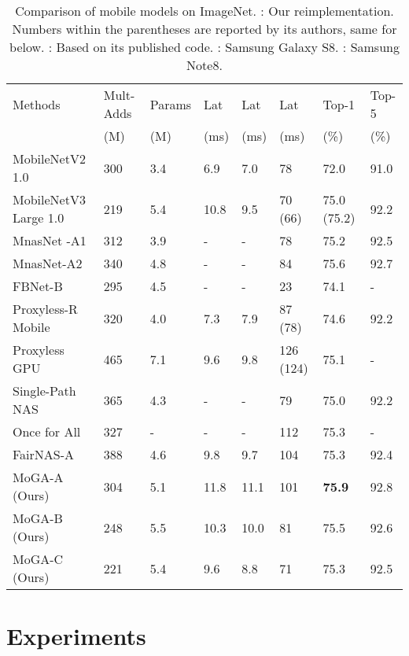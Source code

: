 \documentclass[letterpaper]{article} \usepackage{aaai20}  \usepackage{times}  \usepackage{helvet} \usepackage{courier}  \usepackage[hyphens]{url}  \usepackage{graphicx} \urlstyle{rm} \def\UrlFont{\rm}  \usepackage{graphicx}  \usepackage{amsmath}
\begin{document}
\begin{table*}
	\begin{center}
	  \begin{small}
		\begin{tabular}{*{8}{l}} 			
		\toprule
			Methods & Mult-Adds  & Params & Lat&  Lat& Lat & Top-1  & Top-5  \\
			& (M) & (M) & (ms) & (ms) & (ms) & (\%) & (\%) \\
			\midrule
			MobileNetV2 1.0 \cite{sandler2018mobilenetv2}& 300 & 3.4 & 6.9 & 7.0 & 78 & 72.0 & 91.0\\ MobileNetV3 Large 1.0  \cite{howard2019searching} & 219 & 5.4 & 10.8 & 9.5 &70 (66) &75.0 (75.2) & 92.2 \\ \midrule
			MnasNet -A1 \cite{tan2018mnasnet} & 312 & 3.9 &- &- & 78 & 75.2 & 92.5 \\ MnasNet-A2 \cite{tan2018mnasnet}  & 340 & 4.8 &- & -& 84 & 75.6 & 92.7 \\ FBNet-B \cite{wu2018fbnet} & 295 & 4.5 &- & -& 23  & 74.1 & - \\ Proxyless-R Mobile \cite{cai2018proxylessnas}   & 320 & 4.0 & 7.3 & 7.9 & 87 (78) & 74.6 & 92.2 \\  Proxyless GPU \cite{cai2018proxylessnas}  & 465 & 7.1 & 9.6 & 9.8 & 126 (124) & 75.1 & -\\ Single-Path NAS \cite{stamoulis2019single} & 365 & 4.3 & -& -& 79 & 75.0 & 92.2 \\ Once for All \cite{cai2019once} & 327& - & - & - & 112  & 75.3 & - \\
			 FairNAS-A \cite{chu2019fairnas}  & 388& 4.6 & 9.8 &9.7 & 104 & 75.3 & 92.4 \\ MoGA-A (Ours) & 304 & 5.1 & 11.8 & 11.1 &  101 & \textbf{75.9} & 92.8 \\
MoGA-B (Ours) & 248 & 5.5 & 10.3 & 10.0 &  81 & 75.5 & 92.6 \\
			 MoGA-C (Ours) & 221 & 5.4 & 9.6 & 8.8 &   71 & 75.3  & 92.5 \\
			\bottomrule
		\end{tabular}
		\end{small}
	\end{center}
	\caption{Comparison of mobile models on ImageNet.  : Our reimplementation. Numbers within the parentheses are reported by its authors, same for below. : Based on its published code. : Samsung Galaxy S8. : Samsung Note8.} 
	\label{tab:comparison-imagenet}
\end{table*}

\section{Experiments}
\label{sec:exp}
\end{document}
